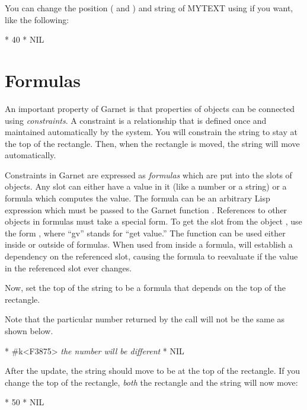 You can change the position ( and ) and string of
MYTEXT using  if you want, like the following:
\begin{programexample}
* 
40
* 
NIL
\end{programexample}


\section{Formulas}
An important property of Garnet is that properties of objects can be
connected using {\it constraints}.  A constraint is a relationship that is
defined once and maintained automatically by the system.  You
will constrain the string to stay at the top of the rectangle.  Then, when
the rectangle is moved, the string will move automatically.

Constraints in Garnet are expressed as {\it formulas} which are put into the
slots of objects.  Any slot can either have a value in it (like a number or
a string) or a formula which computes the value.  The formula can be an
arbitrary Lisp expression which must be passed to the Garnet function
.  References to other objects in formulas must take a special
form.  To get the slot  from the object
, use the form , where
``gv'' stands for ``get value.''  The  function can be used either
inside or outside of formulas.  When used from inside a formula,  will
establish a dependency on the referenced slot, causing the formula to
reevaluate if the value in the referenced slot ever changes.

Now, set the top of the string to be a formula that depends on the
top of the rectangle.

Note that the particular number returned by the  call will not
be the same as shown below.
\begin{programexample}
* 
\#k<F3875>   {\it the number will be different}
* 
NIL
\end{programexample}

After the update, the string should move to be at the top of the rectangle.
If you change the top of the rectangle, {\it both} the rectangle and the string
will now move:
\begin{programexample}
* 
50
* 
NIL
\end{programexample}

